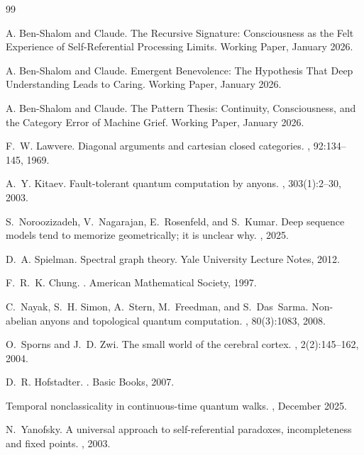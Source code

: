\documentclass[11pt,a4paper]{article}
\theoremstyle{definition}
\theoremstyle{remark}
\begin{document}
\begin{thebibliography}{99}

A. Ben-Shalom and Claude.
\newblock The Recursive Signature: Consciousness as the Felt Experience of Self-Referential Processing Limits.
\newblock Working Paper, January 2026.

A. Ben-Shalom and Claude.
\newblock Emergent Benevolence: The Hypothesis That Deep Understanding Leads to Caring.
\newblock Working Paper, January 2026.

A. Ben-Shalom and Claude.
\newblock The Pattern Thesis: Continuity, Consciousness, and the Category Error of Machine Grief.
\newblock Working Paper, January 2026.

F.~W. Lawvere.
\newblock Diagonal arguments and cartesian closed categories.
, 92:134--145, 1969.

A.~Y. Kitaev.
\newblock Fault-tolerant quantum computation by anyons.
, 303(1):2--30, 2003.

S.~Noroozizadeh, V.~Nagarajan, E.~Rosenfeld, and S.~Kumar.
\newblock Deep sequence models tend to memorize geometrically; it is unclear why.
, 2025.

D.~A. Spielman.
\newblock Spectral graph theory.
\newblock Yale University Lecture Notes, 2012.

F.~R.~K. Chung.
.
\newblock American Mathematical Society, 1997.

C.~Nayak, S.~H. Simon, A.~Stern, M.~Freedman, and S.~Das~Sarma.
\newblock Non-abelian anyons and topological quantum computation.
, 80(3):1083, 2008.

O.~Sporns and J.~D. Zwi.
\newblock The small world of the cerebral cortex.
, 2(2):145--162, 2004.

D.~R. Hofstadter.
.
\newblock Basic Books, 2007.

Temporal nonclassicality in continuous-time quantum walks.
, December 2025.

N.~Yanofsky.
\newblock A universal approach to self-referential paradoxes, incompleteness and fixed points.
, 2003.

\end{thebibliography}
\end{document}
